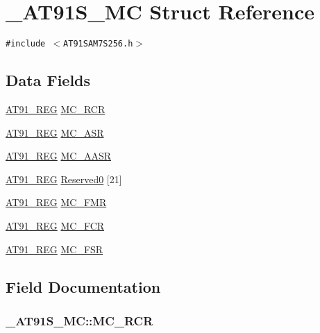\hypertarget{struct__AT91S__MC}{
\section{\_\-AT91S\_\-MC Struct Reference}
\label{struct__AT91S__MC}
}
{\tt \#include $<$AT91SAM7S256.h$>$}

\subsection*{Data Fields}
\begin{CompactItemize}
\item 
\hyperlink{AT91SAM7X256_8h_712ad5a1ac1bd02f3e95a7526c283ce1}{AT91\_\-REG} \hyperlink{struct__AT91S__MC_57612900eca5edeaf8ac6abf329b377b}{MC\_\-RCR}
\item 
\hyperlink{AT91SAM7X256_8h_712ad5a1ac1bd02f3e95a7526c283ce1}{AT91\_\-REG} \hyperlink{struct__AT91S__MC_b47579897e838e5bbfb891e81da1652c}{MC\_\-ASR}
\item 
\hyperlink{AT91SAM7X256_8h_712ad5a1ac1bd02f3e95a7526c283ce1}{AT91\_\-REG} \hyperlink{struct__AT91S__MC_f933b6454cfd253ef5432fdd3101d70f}{MC\_\-AASR}
\item 
\hyperlink{AT91SAM7X256_8h_712ad5a1ac1bd02f3e95a7526c283ce1}{AT91\_\-REG} \hyperlink{struct__AT91S__MC_582ab62c12a101ecabef840aea6af54b}{Reserved0} \mbox{[}21\mbox{]}
\item 
\hyperlink{AT91SAM7X256_8h_712ad5a1ac1bd02f3e95a7526c283ce1}{AT91\_\-REG} \hyperlink{struct__AT91S__MC_9552be45c7dbc7f54aa406c6b77ee7e5}{MC\_\-FMR}
\item 
\hyperlink{AT91SAM7X256_8h_712ad5a1ac1bd02f3e95a7526c283ce1}{AT91\_\-REG} \hyperlink{struct__AT91S__MC_e7a860b146a2962b83c31ed2750da583}{MC\_\-FCR}
\item 
\hyperlink{AT91SAM7X256_8h_712ad5a1ac1bd02f3e95a7526c283ce1}{AT91\_\-REG} \hyperlink{struct__AT91S__MC_b2884bb7b1cbca9125cde189992a6ea7}{MC\_\-FSR}
\end{CompactItemize}


\subsection{Field Documentation}
\hypertarget{struct__AT91S__MC_57612900eca5edeaf8ac6abf329b377b}{
\subsubsection{ {\bf \_\-AT91S\_\-MC::MC\_\-RCR}}}
\label{struct__AT91S__MC_57612900eca5edeaf8ac6abf329b377b}




